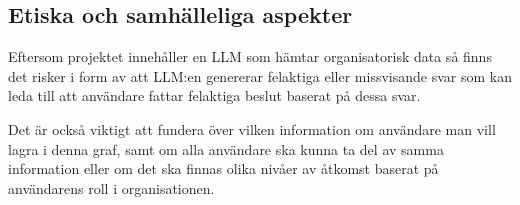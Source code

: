\subsection{Etiska och samhälleliga aspekter}\label{subsec:ethical_discussions}

Eftersom projektet innehåller en LLM som hämtar organisatorisk data så finns det risker i form av att LLM:en genererar felaktiga eller missvisande svar som kan leda till att användare fattar felaktiga beslut baserat på dessa svar.

Det är också viktigt att fundera över vilken information om användare man vill lagra i denna graf, samt om alla användare ska kunna ta del av samma information eller om det ska finnas olika nivåer av åtkomst baserat på användarens roll i organisationen.



